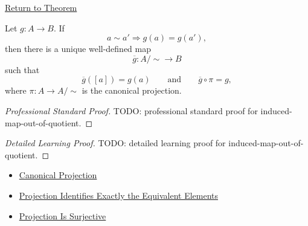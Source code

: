 \newpage
{}
\label{prf:induced-map-out-of-quotient}

\begin{remark*}[Return]
\hyperref[thm:induced-map-out-of-quotient]{Return to Theorem}
\end{remark*}

\begin{theorem*}
Let $g:A\to B$. If
\[
a\sim a'\Longrightarrow g(a)=g(a'),
\]
then there is a unique well-defined map
\[
\overline{g}:A/{\sim}\to B
\]
such that
\[
\overline{g}([a])=g(a)
\qquad\text{and}\qquad
\overline{g}\circ\pi=g,
\]
where $\pi:A\to A/{\sim}$ is the canonical projection.
\end{theorem*}

\begin{proof}[Professional Standard Proof]
\LRAProofBodyStart
TODO: professional standard proof for induced-map-out-of-quotient.
\end{proof}

\begin{proof}[Detailed Learning Proof]
\LRAProofBodyStart
TODO: detailed learning proof for induced-map-out-of-quotient.
\end{proof}

\begin{remark*}
\end{remark*}

\begin{dependencies}
\begin{itemize}
  \item \hyperref[def:canonical-projection]{Canonical Projection}
  \item \hyperref[prop:projection-identifies-equivalent-elements]{Projection Identifies Exactly the Equivalent Elements}
  \item \hyperref[prop:projection-is-surjective]{Projection Is Surjective}
\end{itemize}
\end{dependencies}

\clearpage
